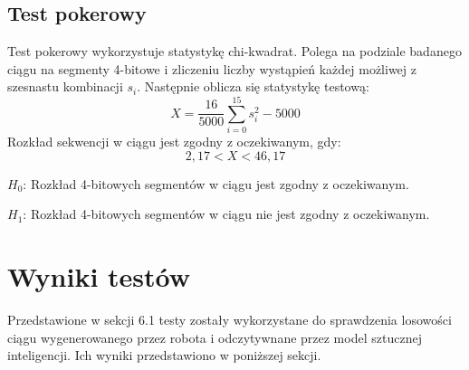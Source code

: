\subsection{Test pokerowy}
Test pokerowy wykorzystuje statystykę chi-kwadrat. Polega na podziale badanego ciągu na segmenty 4-bitowe i zliczeniu
liczby wystąpień każdej możliwej z szesnastu kombinacji \begin{math}s_i\end{math}. Następnie oblicza się statystykę
testową:
\begin{displaymath}
    X = \frac{16}{5000} \sum^{15}_{i=0} s_i^2 - 5000
\end{displaymath}
Rozkład sekwencji w ciągu jest zgodny z oczekiwanym, gdy:
\begin{displaymath}
    2{,}17 < X < 46{,}17
\end{displaymath}
\par \begin{math} H_0 \end{math}: Rozkład 4-bitowych segmentów w ciągu jest zgodny z oczekiwanym.
\par \begin{math} H_1 \end{math}: Rozkład 4-bitowych segmentów w ciągu nie jest zgodny z oczekiwanym.



\section{Wyniki testów}
Przedstawione w sekcji 6.1 testy zostały wykorzystane do sprawdzenia losowości ciągu wygenerowanego przez robota i 
odczytywnane przez model sztucznej inteligencji. Ich wyniki przedstawiono w poniższej sekcji.
